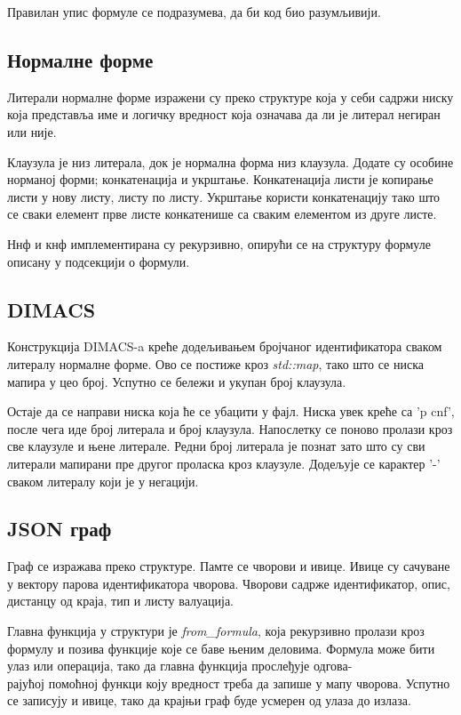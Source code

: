 \documentclass[a4paper,10pt]{article}
\begin{document}
Правилан упис формуле се подразумева, да би код био разумљивији.

\subsection{Нормалне форме}
Литерали нормалне форме изражени су преко структуре која у себи садржи ниску која представља име и логичку вредност која означава да ли је литерал негиран или није.\cite{ar_vezbe}

Клаузула је низ литерала, док је нормална форма низ клаузула. Додате су особине норманој форми; конкатенација и укрштање. Конкатенација листи је копирање листи у нову листу, листу по листу. Укрштање користи конкатенацију тако што се сваки елемент прве листе конкатенише са сваким елементом из друге листе.\cite{ar_vezbe}

Ннф и кнф имплементирана су рекурзивно, опирући се на структуру формуле описану у подсекцији о формули\cite{ar_vezbe}.

\subsection{DIMACS}
Конструкција DIMACS-a креће додељивањем бројчаног идентификатора сваком литералу нормалне форме. Ово се постиже кроз \textit{std::map}, тако што се ниска мапира у цео број. Успутно се бележи и укупан број клаузула.

Остаје да се направи ниска која ће се убацити у фајл. Ниска увек креће са 'p cnf', после чега иде број литерала и број клаузула. Напослетку се поново пролази кроз све клаузуле и њене литерале. Редни број литерала је познат зато што су сви литерали мапирани пре другог проласка кроз клаузуле. Додељује се карактер '-' сваком литералу који је у негацији.

\subsection{JSON граф}
Граф се изражава преко структуре. Памте се чворови и ивице. Ивице су сачуване у вектору парова идентификатора чворова. Чворови садрже идентификатор, опис, дистанцу од краја, тип и листу валуација.

Главна функција у структури је \textit{from\_formula}, која рекурзивно пролази кроз формулу и позива функције које се баве њеним деловима. Формула може бити улаз или операција, тако да главна функција прослеђује одгова-\\рајућој помоћној функци коју вредност треба да запише у мапу чворова. Успутно се записују и ивице, тако да крајњи граф буде усмерен од улаза до излаза.
\end{document}
